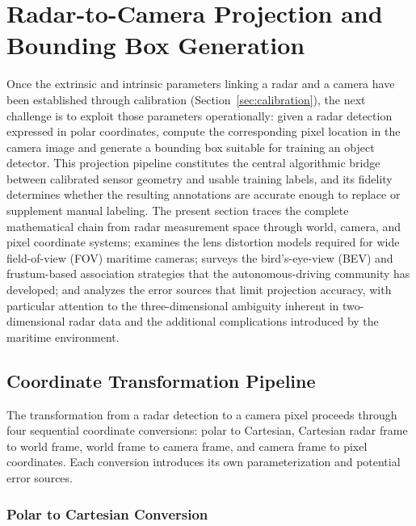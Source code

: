 
\section{Radar-to-Camera Projection and Bounding Box Generation}\label{sec:projection}

Once the extrinsic and intrinsic parameters linking a radar and a camera have been established through calibration (Section~\ref{sec:calibration}), the next challenge is to exploit those parameters operationally: given a radar detection expressed in polar coordinates, compute the corresponding pixel location in the camera image and generate a bounding box suitable for training an object detector. This projection pipeline constitutes the central algorithmic bridge between calibrated sensor geometry and usable training labels, and its fidelity determines whether the resulting annotations are accurate enough to replace or supplement manual labeling. The present section traces the complete mathematical chain from radar measurement space through world, camera, and pixel coordinate systems; examines the lens distortion models required for wide field-of-view (FOV) maritime cameras; surveys the bird's-eye-view (BEV) and frustum-based association strategies that the autonomous-driving community has developed; and analyzes the error sources that limit projection accuracy, with particular attention to the three-dimensional ambiguity inherent in two-dimensional radar data and the additional complications introduced by the maritime environment.

\subsection{Coordinate Transformation Pipeline}\label{subsec:coord_transform}

The transformation from a radar detection to a camera pixel proceeds through four sequential coordinate conversions: polar to Cartesian, Cartesian radar frame to world frame, world frame to camera frame, and camera frame to pixel coordinates. Each conversion introduces its own parameterization and potential error sources.

\subsubsection{Polar to Cartesian Conversion}

